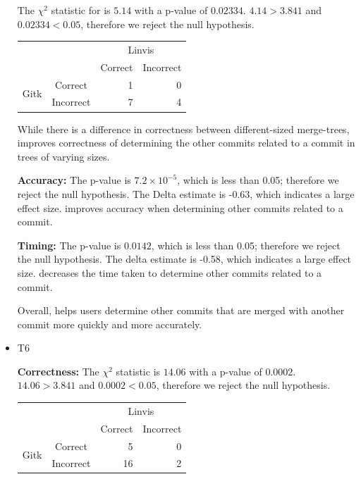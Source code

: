\begin{itemize}
    The $\chi^2$ statistic for \comB is $5.14$ with a p-value of
    $0.02334$. $4.14 > 3.841$ and $0.02334 < 0.05$, therefore we reject
    the null hypothesis.
    \vspace{2mm}
    \begin{tabular}{cc|rr}
                             &           & \multicolumn{2}{c}{Linvis}\\
                             &           & Correct                      & Incorrect\\\hline
      \multirow{2}{*}{Gitk}  & Correct   & 1                            & 0\\
                             & Incorrect & 7                            & 4\\
    \end{tabular}
    \vspace{3mm}

    While there is a difference in correctness between different-sized
    merge-trees, \tool improves correctness of determining the other
    commits related to a commit in trees of varying sizes.

    \textbf{Accuracy:}
    The p-value is $7.2 \times 10^{-5}$, which is less than 0.05;
    therefore we reject the null hypothesis. The Delta estimate is
    -0.63, which indicates a large effect size. \tool improves
    accuracy when determining other commits related to a commit.


    \textbf{Timing:}
    The p-value is $0.0142$, which is less than 0.05; therefore we
    reject the null hypothesis. The delta estimate is -0.58, which
    indicates a large effect size. \tool decreases the time taken to
    determine other commits related to a commit.

    Overall, \tool helps users determine other commits that are merged
    with another commit more quickly and more accurately.

  \item T6

    \textbf{Correctness:}
    The $\chi^2$ statistic is $14.06$ with a p-value of $0.0002$.
    $14.06 > 3.841$ and $0.0002 < 0.05$, therefore we reject the null
    hypothesis.
    \vspace{2mm}
    \begin{tabular}{cc|rr}
      &           & \multicolumn{2}{c}{Linvis}\\
      &           & Correct                      & Incorrect\\\hline
      \multirow{2}{*}{Gitk} & Correct   & 5                            & 0\\
      & Incorrect & 16                           & 2\\
    \end{tabular}
    \vspace{3mm}


\end{itemize}
